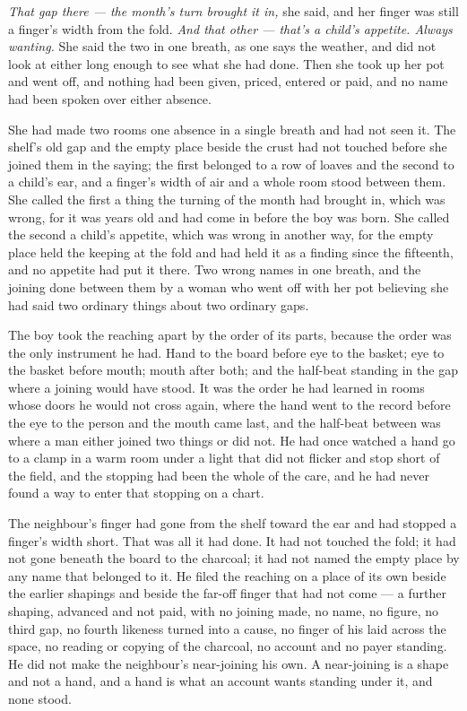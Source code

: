 \emph{That gap there --- the month's turn brought it in,} she said, and her finger was still a finger's width from the fold. \emph{And that other --- that's a child's appetite. Always wanting.} She said the two in one breath, as one says the weather, and did not look at either long enough to see what she had done. Then she took up her pot and went off, and nothing had been given, priced, entered or paid, and no name had been spoken over either absence.

She had made two rooms one absence in a single breath and had not seen it. The shelf's old gap and the empty place beside the crust had not touched before she joined them in the saying; the first belonged to a row of loaves and the second to a child's ear, and a finger's width of air and a whole room stood between them. She called the first a thing the turning of the month had brought in, which was wrong, for it was years old and had come in before the boy was born. She called the second a child's appetite, which was wrong in another way, for the empty place held the keeping at the fold and had held it as a finding since the fifteenth, and no appetite had put it there. Two wrong names in one breath, and the joining done between them by a woman who went off with her pot believing she had said two ordinary things about two ordinary gaps.

The boy took the reaching apart by the order of its parts, because the order was the only instrument he had. Hand to the board before eye to the basket; eye to the basket before mouth; mouth after both; and the half-beat standing in the gap where a joining would have stood. It was the order he had learned in rooms whose doors he would not cross again, where the hand went to the record before the eye to the person and the mouth came last, and the half-beat between was where a man either joined two things or did not. He had once watched a hand go to a clamp in a warm room under a light that did not flicker and stop short of the field, and the stopping had been the whole of the care, and he had never found a way to enter that stopping on a chart.

The neighbour's finger had gone from the shelf toward the ear and had stopped a finger's width short. That was all it had done. It had not touched the fold; it had not gone beneath the board to the charcoal; it had not named the empty place by any name that belonged to it. He filed the reaching on a place of its own beside the earlier shapings and beside the far-off finger that had not come --- a further shaping, advanced and not paid, with no joining made, no name, no figure, no third gap, no fourth likeness turned into a cause, no finger of his laid across the space, no reading or copying of the charcoal, no account and no payer standing. He did not make the neighbour's near-joining his own. A near-joining is a shape and not a hand, and a hand is what an account wants standing under it, and none stood.

